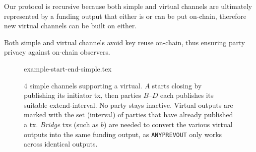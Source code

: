   Our protocol is recursive because both simple and virtual channels are
  ultimately represented by a funding output that either is or can be put
  on-chain, therefore new virtual channels can be built on either.

  Both simple and virtual channels avoid key reuse on-chain, thus ensuring party
  privacy against on-chain observers.

  \begin{figure}[!htbp]
    \centering
    {example-start-end-simple.tex}
    \caption{$4$ simple channels supporting a virtual. $A$ starts closing by
    publishing its initiator tx, then parties $B$--$D$ each publishes its
    suitable extend-interval. No party stays inactive.
    Virtual outputs are marked with the set (interval) of parties that have
    already published a tx. \emph{Bridge} txs
    (such as $b$) are needed to convert the various virtual outputs into the
    same funding output, as \texttt{ANYPREVOUT} only works across identical
    outputs.}
    \label{figure:example-start-end-simple}
  \end{figure}

